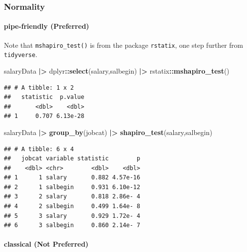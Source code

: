 \documentclass[
]{ctexart}
\newenvironment{Shaded}{\begin{snugshade}}{\end{snugshade}}
\newcommand{\FunctionTok}[1]{\textcolor[rgb]{0.13,0.29,0.53}{\textbf{#1}}}
\newcommand{\NormalTok}[1]{#1}
\newcommand{\SpecialCharTok}[1]{\textcolor[rgb]{0.81,0.36,0.00}{\textbf{#1}}}
\begin{document}
\hypertarget{normality}{%
\subsubsection{Normality}\label{normality}}

\hypertarget{pipe-friendly-preferred}{%
\paragraph{pipe-friendly (Preferred)}\label{pipe-friendly-preferred}}

Note that \texttt{mshapiro\_test()} is from the package
\texttt{rstatix}, one step further from \texttt{tidyverse}.

\begin{Shaded}
\begin{Highlighting}[]
\NormalTok{salaryData }\SpecialCharTok{|\textgreater{}}\NormalTok{ dplyr}\SpecialCharTok{::}\FunctionTok{select}\NormalTok{(salary,salbegin) }\SpecialCharTok{|\textgreater{}} 
\NormalTok{  rstatix}\SpecialCharTok{::}\FunctionTok{mshapiro\_test}\NormalTok{()}
\end{Highlighting}
\end{Shaded}

\begin{verbatim}
## # A tibble: 1 x 2
##   statistic  p.value
##       <dbl>    <dbl>
## 1     0.707 6.13e-28
\end{verbatim}

\begin{Shaded}
\begin{Highlighting}[]
\NormalTok{salaryData }\SpecialCharTok{|\textgreater{}} \FunctionTok{group\_by}\NormalTok{(jobcat) }\SpecialCharTok{|\textgreater{}} 
  \FunctionTok{shapiro\_test}\NormalTok{(salary,salbegin)}
\end{Highlighting}
\end{Shaded}

\begin{verbatim}
## # A tibble: 6 x 4
##   jobcat variable statistic        p
##    <dbl> <chr>        <dbl>    <dbl>
## 1      1 salary       0.882 4.57e-16
## 2      1 salbegin     0.931 6.10e-12
## 3      2 salary       0.818 2.86e- 4
## 4      2 salbegin     0.499 1.64e- 8
## 5      3 salary       0.929 1.72e- 4
## 6      3 salbegin     0.860 2.14e- 7
\end{verbatim}

\hypertarget{classical-not-preferred}{%
\paragraph{classical (Not Preferred)}\label{classical-not-preferred}}
\end{document}

